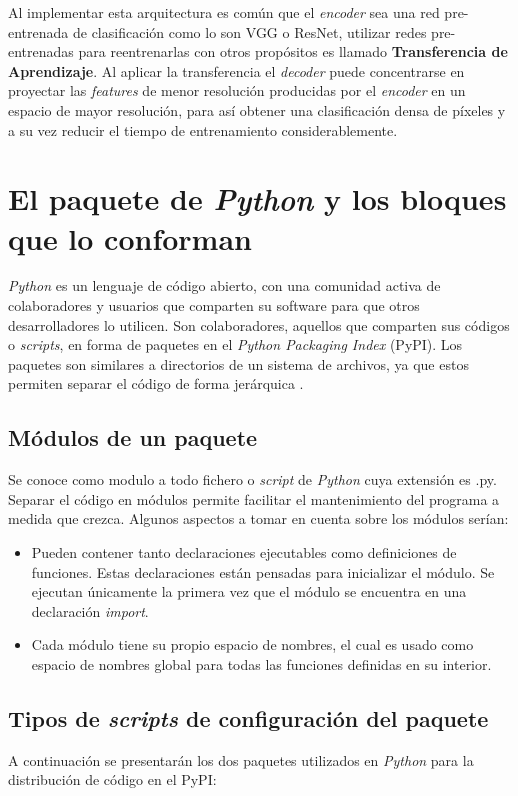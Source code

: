 Al implementar esta arquitectura es común que el \textit{encoder} sea una red pre-entrenada de clasificación como lo son VGG o ResNet, utilizar redes pre-entrenadas para reentrenarlas con otros propósitos es llamado \textbf{Transferencia de Aprendizaje}. Al aplicar la transferencia el \textit{decoder} puede concentrarse en proyectar las \textit{features} de menor resolución producidas por el \textit{encoder} en un espacio de mayor resolución, para así obtener una clasificación densa de píxeles y a su vez reducir el tiempo de entrenamiento considerablemente.
\section{El paquete de \textit{Python} y los bloques que lo conforman}
\textit{Python} es un lenguaje de código abierto, con una comunidad activa de colaboradores y usuarios que comparten su software para que otros desarrolladores lo utilicen. Son colaboradores, aquellos que comparten sus códigos o \textit{scripts}, en forma de paquetes en el \textit{Python Packaging Index} (PyPI). Los paquetes son similares a directorios de un sistema de archivos, ya que estos permiten separar el código de forma jerárquica \cite{Paquetes}. 
\subsection{Módulos de un paquete}
Se conoce como modulo a todo fichero o \textit{script} de \textit{Python} cuya extensión es .py. Separar el código en módulos permite facilitar el mantenimiento del programa a medida que crezca. Algunos aspectos a tomar en cuenta sobre los módulos serían:
\begin{itemize}
    \item Pueden contener tanto declaraciones ejecutables como definiciones de funciones. Estas declaraciones están pensadas para inicializar el módulo. Se ejecutan únicamente la primera vez que el módulo se encuentra en una declaración \textit{import}\cite{ModuloPython}.
    \item Cada módulo tiene su propio espacio de nombres, el cual es usado como espacio de nombres global para todas las funciones definidas en su interior.
\end{itemize}
\subsection{Tipos de \textit{scripts} de configuración del paquete}
A continuación se presentarán los dos paquetes utilizados en \textit{Python} para la distribución de código en el PyPI:
